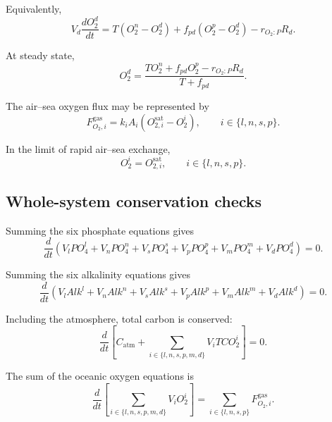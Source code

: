 \documentclass[11pt]{article}
\begin{document}
Equivalently,
\begin{equation}
V_d\frac{dO_2^d}{dt}
=
T\left(O_2^n-O_2^d\right)
+
f_{pd}\left(O_2^p-O_2^d\right)
-
r_{O_2:P}R_d.
\label{eq:six_o2_d_compact}
\end{equation}

At steady state,
\begin{equation}
O_2^d
=
\frac{
T O_2^n
+
f_{pd}O_2^p
-
r_{O_2:P}R_d
}{
T+f_{pd}
}.
\label{eq:six_o2_d_steady}
\end{equation}

The air--sea oxygen flux may be represented by
\begin{equation}
F^{\mathrm{gas}}_{O_2,i}
=
k_iA_i
\left(
O_{2,i}^{\mathrm{sat}}-O_2^i
\right),
\qquad
i\in\{l,n,s,p\}.
\label{eq:six_o2_gas_flux}
\end{equation}

In the limit of rapid air--sea exchange,
\begin{equation}
O_2^i=O_{2,i}^{\mathrm{sat}},
\qquad
i\in\{l,n,s,p\}.
\label{eq:six_o2_saturation}
\end{equation}

\subsection{Whole-system conservation checks}

Summing the six phosphate equations gives
\begin{equation}
\frac{d}{dt}
\left(
V_lPO_4^l
+
V_nPO_4^n
+
V_sPO_4^s
+
V_pPO_4^p
+
V_mPO_4^m
+
V_dPO_4^d
\right)
=
0.
\label{eq:six_total_po4}
\end{equation}

Summing the six alkalinity equations gives
\begin{equation}
\frac{d}{dt}
\left(
V_lAlk^l
+
V_nAlk^n
+
V_sAlk^s
+
V_pAlk^p
+
V_mAlk^m
+
V_dAlk^d
\right)
=
0.
\label{eq:six_total_alk}
\end{equation}

Including the atmosphere, total carbon is conserved:
\begin{equation}
\frac{d}{dt}
\left[
C_{\mathrm{atm}}
+
\sum_{i\in\{l,n,s,p,m,d\}}
V_iTCO_2^i
\right]
=
0.
\label{eq:six_total_carbon}
\end{equation}

The sum of the oceanic oxygen equations is
\begin{equation}
\frac{d}{dt}
\left[
\sum_{i\in\{l,n,s,p,m,d\}}
V_iO_2^i
\right]
=
\sum_{i\in\{l,n,s,p\}}
F^{\mathrm{gas}}_{O_2,i}.
\label{eq:six_total_o2}
\end{equation}
\end{document}
